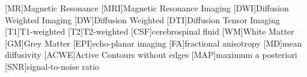 [MR]{Magnetic Resonance}
[MRI]{Magnetic Resonance Imaging}
[DWI]{Diffusion Weighted Imaging}
[DW]{Diffusion Weighted}
[DTI]{Diffusion Tensor Imaging}
[T1]{T1-weighted}
[T2]{T2-weighted}
[CSF]{cerebrospinal fluid}
[WM]{White Matter}
[GM]{Grey Matter}
[EPI]{echo-planar imaging}
[FA]{fractional anisotropy}
[MD]{mean diffusivity}
[ACWE]{Active Contours without edges}
[MAP]{maximum a posteriori}
[SNR]{signal-to-noise ratio}